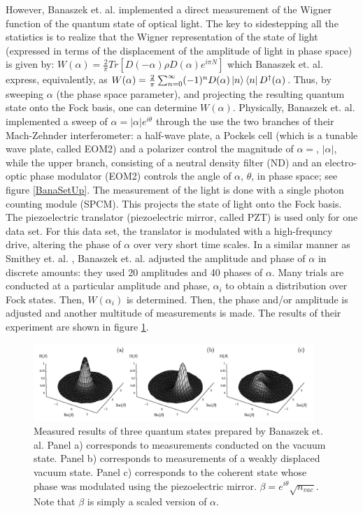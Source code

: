 However, Banaszek et. al. implemented a direct measurement of the Wigner function of the quantum state of optical light. The key to sidestepping all the statistics is to realize that the Wigner representation of the state of light (expressed in terms of the displacement of the amplitude of light in phase space) is given by: $W(\alpha)=\frac{2}{\pi}Tr[D(-\alpha)\rho D(\alpha)e^{i\pi N}]$ \cite{Deleglise} which Banaszek et. al. express, equivalently, as  $W(\alpha)=\frac{2}{\pi}\sum_{n=0}^{\infty}(-1)^n D(\alpha)\ket{n}\bra{n} D^\dagger(\alpha)$. Thus, by sweeping $\alpha$ (the phase space parameter), and projecting the resulting quantum state onto the Fock basis, one can determine $W(\alpha)$. Physically, Banaszek et. al. implemented a sweep of $\alpha=|\alpha|e^{i\theta}$ through the use the two branches of their Mach-Zehnder interferometer: a half-wave plate, a Pockels cell (which is a tunable wave plate, called EOM2) and a polarizer control the magnitude of $\alpha=$, $|\alpha|$, while the upper branch, consisting of a neutral density filter (ND) and an electro-optic phase modulator (EOM2) controls the angle of $\alpha$, $\theta$, in phase space; see figure \ref{BanaSetUp}. The measurement of the light is done with a single photon counting module (SPCM). This projects the state of light onto the Fock basis. The piezoelectric translator (piezoelectric mirror, called PZT) is used only for one data set. For this data set, the translator is modulated with a high-frequncy drive, altering the phase of $\alpha$ over very short time scales. In a similar manner as Smithey et. al. \cite{Smithey}, Banaszek et. al. adjusted the amplitude and phase of $\alpha$ in discrete amounts: they used 20 amplitudes and 40 phases of $\alpha$. Many trials are conducted at a particular amplitude and phase, $\alpha_i$ to obtain a distribution over Fock states. Then, $W(\alpha_i)$ is determined. Then, the phase and/or amplitude is adjusted and another multitude of measurements is made. The results of their experiment are shown in figure \ref{BanaResults}.



\begin{figure}%
\includegraphics[width=400px,height=111px]{Figures/BanaResults.png}%
\caption{Measured results of three quantum states prepared by Banaszek et. al. Panel a) corresponds to measurements conducted on the vacuum state. Panel b) corresponds to measurements of a weakly displaced vacuum state. Panel c) corresponds to the coherent state whose phase was modulated using the piezoelectric mirror. $\beta=e^{i\theta}\sqrt{n_{vac}}$. Note that $\beta$ is simply a scaled version of $\alpha$.}%
\label{BanaResults}%
\end{figure}